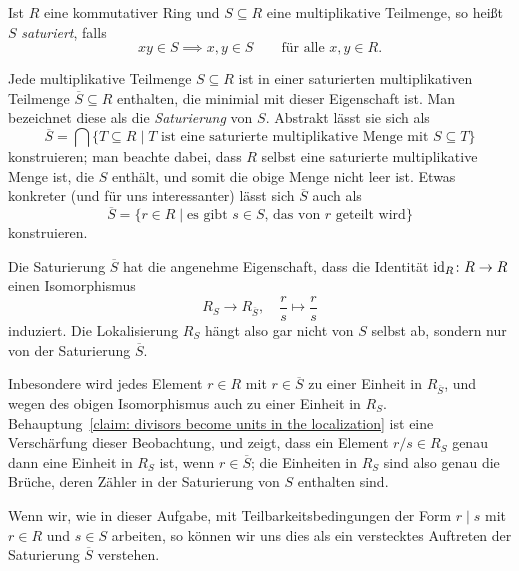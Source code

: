 \documentclass[a4paper,10pt,numbers=noenddot]{scrartcl}
\begin{document}
\begin{remark}
  Ist $R$ eine kommutativer Ring und $S \subseteq R$ eine multiplikative Teilmenge, so heißt $S$ \emph{saturiert}, falls
  \[
    x y \in S \implies x, y \in S
    \qquad
    \text{für alle $x, y \in R$}.
  \]
  
  Jede multiplikative Teilmenge $S \subseteq R$ ist in einer saturierten multiplikativen Teilmenge $\overline{S} \subseteq R$ enthalten, die minimial mit dieser Eigenschaft ist.
  Man bezeichnet diese als die \emph{Saturierung} von $S$.
  Abstrakt lässt sie sich als
  \[
      \overline{S}
    = \bigcap \{
                T \subseteq R
              \mid
                \text{$T$ ist eine saturierte multiplikative Menge mit $S \subseteq T$}
              \}
  \]
  konstruieren; man beachte dabei, dass $R$ selbst eine saturierte multiplikative Menge ist, die $S$ enthält, und somit die obige Menge nicht leer ist.
  Etwas konkreter (und für uns interessanter) lässt sich $\overline{S}$ auch als
  \[
      \overline{S}
    = \{
        r \in R
        \mid
        \text{es gibt $s \in S$, das von $r$ geteilt wird}
      \}
  \]
  konstruieren.
  
  Die Saturierung $\overline{S}$ hat die angenehme Eigenschaft, dass die Identität $\operatorname{id}_R \colon R \to R$ einen Isomorphismus
  \[
    R_S \to R_{\overline{S}},
    \quad
    \frac{r}{s} \mapsto \frac{r}{s}
  \]
  induziert.
  Die Lokalisierung $R_S$ hängt also gar nicht von $S$ selbst ab, sondern nur von der Saturierung $\overline{S}$.
  
  Inbesondere wird jedes Element $r \in R$ mit $r \in \overline{S}$ zu einer Einheit in $R_{\overline{S}}$, und wegen des obigen Isomorphismus auch zu einer Einheit in $R_S$.
  Behauptung~\ref{claim: divisors become units in the localization} ist eine Verschärfung dieser Beobachtung, und zeigt, dass ein Element $r/s \in R_S$ genau dann eine Einheit in $R_S$ ist, wenn $r \in \overline{S}$; die Einheiten in $R_S$ sind also genau die Brüche, deren Zähler in der Saturierung von $S$ enthalten sind.
  
  Wenn wir, wie in dieser Aufgabe, mit Teilbarkeitsbedingungen der Form $r \mid s$ mit $r \in R$ und $s \in S$ arbeiten, so können wir uns dies als ein verstecktes Auftreten der Saturierung $\overline{S}$ verstehen.
\end{remark}





\subsection{}
\label{subsec: primes become primes in the localization}
\end{document}
